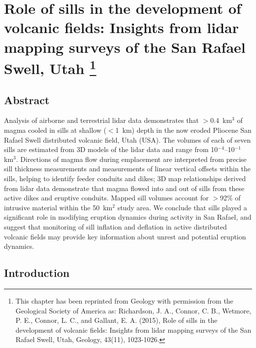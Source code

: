 \chapter[Role of sills in the development of volcanic fields: Insights from lidar mapping surveys of the San Rafael Swell, Utah]{Role of sills in the development of volcanic fields: Insights from lidar mapping surveys of the San Rafael Swell, Utah \footnote{This chapter has been reprinted from Geology with permission from the Geological Society of America as: Richardson, J. A., Connor, C. B., Wetmore, P. E., Connor, L. C., and Gallant, E. A. (2015), Role of sills in the development of volcanic fields: Insights from lidar mapping surveys of the San Rafael Swell, Utah, Geology, 43(11), 1023-1026.}}\label{ch_sills}


\renewcommand*{\FigPath}{figures/chapter-sills}

\section{Abstract}

Analysis of airborne and terrestrial lidar data demonstrates that $>$0.4~km$^3$ of magma cooled in sills at shallow ($<$1~km) depth in the now eroded Pliocene San Rafael Swell distributed volcanic field, Utah (USA). The volumes of each of seven sills are estimated from 3D models of the lidar data and range from 10$^{-4}$--10$^{-1}$ km$^3$. Directions of magma flow during emplacement are interpreted from precise sill thickness measurements and measurements of linear vertical offsets within the sills, helping to identify feeder conduits and dikes; 3D map relationships derived from lidar data demonstrate that magma flowed into and out of sills from these active dikes and eruptive conduits. Mapped sill volumes account for $>$92\% of intrusive material within the 50~km$^2$ study area. We conclude that sills played a significant role in modifying eruption dynamics during activity in San Rafael, and suggest that monitoring of sill inflation and deflation in active distributed volcanic fields may provide key information about unrest and potential eruption dynamics.


\section{Introduction}

